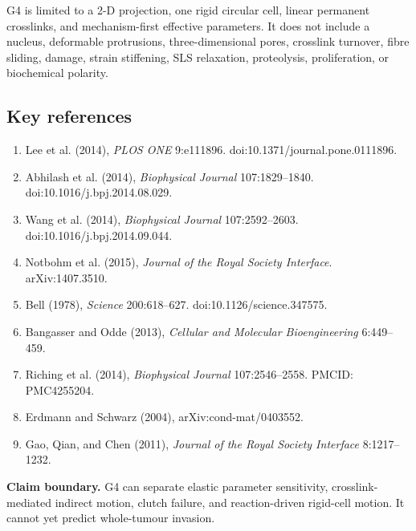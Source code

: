 \documentclass[10.5pt]{article}
\begin{document}
G4 is limited to a 2-D projection, one rigid circular cell, linear permanent crosslinks, and
mechanism-first effective parameters. It does not include a nucleus, deformable protrusions,
three-dimensional pores, crosslink turnover, fibre sliding, damage, strain stiffening, SLS
relaxation, proteolysis, proliferation, or biochemical polarity.

\subsection*{Key references}
\begin{enumerate}[leftmargin=1.5em,itemsep=2pt]
\item Lee et al. (2014), \emph{PLOS ONE} 9:e111896. doi:10.1371/journal.pone.0111896.
\item Abhilash et al. (2014), \emph{Biophysical Journal} 107:1829--1840. doi:10.1016/j.bpj.2014.08.029.
\item Wang et al. (2014), \emph{Biophysical Journal} 107:2592--2603. doi:10.1016/j.bpj.2014.09.044.
\item Notbohm et al. (2015), \emph{Journal of the Royal Society Interface}. arXiv:1407.3510.
\item Bell (1978), \emph{Science} 200:618--627. doi:10.1126/science.347575.
\item Bangasser and Odde (2013), \emph{Cellular and Molecular Bioengineering} 6:449--459.
\item Riching et al. (2014), \emph{Biophysical Journal} 107:2546--2558. PMCID: PMC4255204.
\item Erdmann and Schwarz (2004), arXiv:cond-mat/0403552.
\item Gao, Qian, and Chen (2011), \emph{Journal of the Royal Society Interface} 8:1217--1232.
\end{enumerate}

\medskip
\noindent\textbf{Claim boundary.} G4 can separate elastic parameter sensitivity,
crosslink-mediated indirect motion, clutch failure, and reaction-driven rigid-cell motion. It
cannot yet predict whole-tumour invasion.
\end{document}
